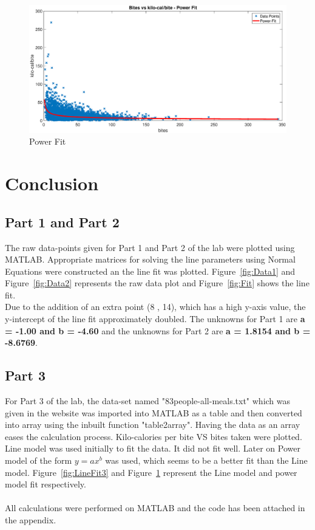 \documentclass{article}
\begin{document}
\begin{figure}[h]
\centering
\includegraphics[width=\textwidth]{powerfit.eps}
\caption{Power Fit}
\label{fig:powerfit}
\end{figure}

\section{Conclusion}
\subsection*{Part 1 and Part 2}
The raw data-points given for Part 1 and Part 2 of the lab were plotted using MATLAB.  Appropriate matrices for solving the line parameters using Normal Equations were constructed an the line fit was plotted. Figure~\ref{fig:Data1} and Figure~\ref{fig:Data2} represents the raw data plot and Figure~\ref{fig:Fit} shows the line fit. \\
Due to the addition of an extra point (8 , 14), which has a high y-axis value, the y-intercept of the line fit approximately doubled. The unknowns for Part 1 are \textbf{a = -1.00 and b = -4.60} and the unknowns for Part 2 are \textbf{a = 1.8154 and b = -8.6769}. \\

\subsection*{Part 3}
For Part 3 of the lab, the data-set named "83people-all-meals.txt" which was given in the website was imported into MATLAB as a table and then converted into array using the inbuilt function "table2array". Having the data as an array eases the calculation process. Kilo-calories per bite VS bites taken were plotted. \\
Line model was used initially to fit the data. It did not fit well. Later on Power model of the form $y = ax^b$ was used, which seems to be a better fit than the Line model. Figure~\ref{fig:LineFit3} and Figure~\ref{fig:powerfit} represent the Line model and power model fit respectively. \\
\quad \\
All calculations were performed on MATLAB and the code has been attached in the appendix. 
\end{document}
